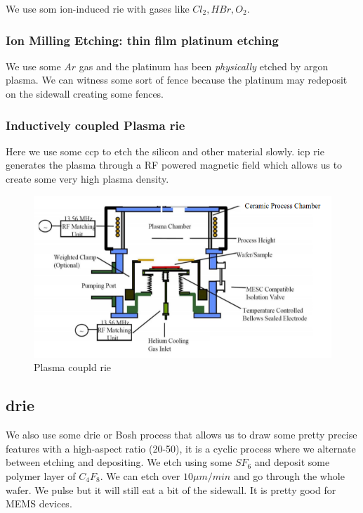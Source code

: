 \documentclass{report}
\begin{document}
We use som ion-induced \gls{rie} with gases like $Cl_2, HBr, O_2$.

\subsubsection{Ion Milling Etching: thin film platinum etching}

We use some $Ar$ gas and the platinum has been \textit{physically} etched by argon plasma. We can witness some sort of fence because the platinum may redeposit on the sidewall creating some fences.

\subsubsection{Inductively coupled Plasma \gls{rie}}

Here we use some \gls{ccp} to etch the silicon and other material slowly. \gls{icp} \gls{rie} generates the plasma through a RF powered magnetic field which allows us to create some very high plasma density.

\begin{figure}[H]
    \centering
    \includegraphics[width=0.75\linewidth]{Setup_plasma_rie.png}
    \caption{Plasma coupld \gls{rie}}
    \label{fig:enter-label}
\end{figure}

\subsection{\gls{drie}}

We also use some \gls{drie} or Bosh process that allows us to draw some pretty precise features with a high-aspect ratio (20-50), it is a cyclic process where we alternate between etching and depositing. We etch using some $SF_6$ and deposit some polymer layer of $C_4F_8$. We can etch over $10 \mu m/min$ and go through the whole wafer. We pulse but it will still eat a bit of the sidewall. It is pretty good for MEMS devices.
\end{document}
